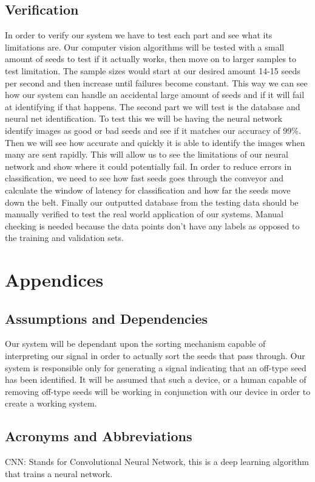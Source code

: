 \documentclass[onecolumn, draftclsnofoot,10pt, compsoc]{IEEEtran}
\begin{document}
\subsection{Verification}
In order to verify our system we have to test each part and see what its limitations are. Our computer vision algorithms will be tested with a small amount of seeds to test if it actually works, then move on to larger samples to test limitation. The sample sizes would start at our desired amount 14-15 seeds per second and then increase until failures become constant. This way we can see how our system can handle an accidental large amount of seeds and if it will fail at identifying if that happens. The second part we will test is the database and neural net identification. To test this we will be having the neural network identify images as good or bad seeds and see if it matches our accuracy of 99\%. Then we will see how accurate and quickly it is able to identify the images when many are sent rapidly. This will allow us to see the limitations of our neural network and show where it could potentially fail. In order to reduce errors in classification, we need to see how fast seeds goes through the conveyor and calculate the window of latency for classification and how far the seeds move down the belt. Finally our outputted database from the testing data should be manually verified to test the real world application of our systems. Manual checking is needed because the data points don’t have any labels as opposed to the training and validation sets. 

\section{Appendices}
\subsection{Assumptions and Dependencies}
Our system will be dependant upon the sorting mechanism capable of interpreting our signal in order to actually sort the seeds that pass through. Our system is responsible only for generating a signal indicating that an off-type seed has been identified. It will be assumed that such a device, or a human capable of removing off-type seeds will be working in conjunction with our device in order to create a working system.

\subsection{Acronyms and Abbreviations}
CNN: Stands for Convolutional Neural Network, this is a deep learning algorithm that trains a neural network.
\end{document}
